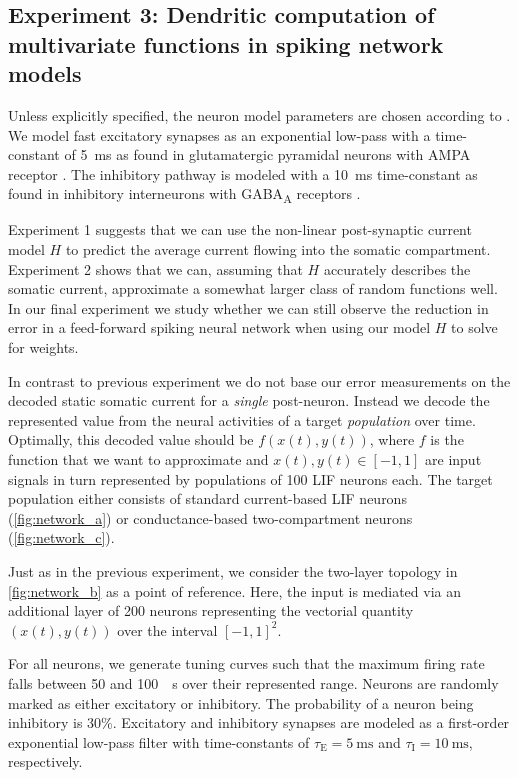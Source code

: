\subsection{Experiment 3: Dendritic computation of multivariate functions in spiking network models}
\label{sec:dendritic_computation_network}
Unless explicitly specified, the neuron model parameters are chosen according to .  We model fast excitatory synapses as an exponential low-pass with a time-constant of \SI{5}{\milli\second} as found in glutamatergic pyramidal neurons with AMPA receptor \citep{jonas1993quantal}. The inhibitory pathway is modeled with a \SI{10}{\milli\second} time-constant as found in inhibitory interneurons with GABA\textsubscript{A} receptors \citep{gupta2000organizing}.

Experiment 1 suggests that we can use the non-linear post-synaptic current model $H$ to predict the average current flowing into the somatic compartment. Experiment 2 shows that we can, assuming that $H$ accurately describes the somatic current, approximate a somewhat larger class of random functions well. In our final experiment we study whether we can still observe the reduction in error in a feed-forward spiking neural network when using our model $H$ to solve for weights.

In contrast to previous experiment we do not base our error measurements on the decoded static somatic current for a \emph{single} post-neuron. Instead we decode the represented value from the neural activities of a target \emph{population} over time. Optimally, this decoded value should be $f(x(t), y(t))$, where $f$ is the function that we want to approximate and $x(t), y(t) \in [-1, 1]$ are input signals in turn represented by populations of \num{100} LIF neurons each. The target population either consists of standard current-based LIF neurons (\cref{fig:network_a}) or conductance-based two-compartment neurons (\cref{fig:network_c}).

Just as in the previous experiment, we consider the two-layer topology in \cref{fig:network_b} as a point of reference. Here, the input is mediated via an additional layer of \num{200} neurons representing the vectorial quantity $(x(t), y(t))$ over the interval $[-1, 1]^2$.

For all neurons, we generate tuning curves such that the maximum firing rate falls between \num{50} and \SI{100}{\per\second} over their represented range. Neurons are randomly marked as either excitatory or inhibitory. The probability of a neuron being inhibitory is 30\%. Excitatory and inhibitory synapses are modeled as a first-order exponential low-pass filter with time-constants of $\tau_\mathrm{E} = \SI{5}{\milli\second}$ and $\tau_\mathrm{I} = \SI{10}{\milli\second}$, respectively.

